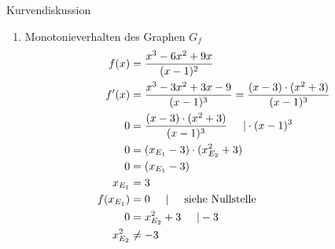 \begin{bsp}{Kurvendiskussion}{}
\begin{enumerate}
\begin{equation*}
\end{equation*}
Damit ergibt sich eine einfache Nullstelle bei $x_1= 0$ und eine doppelte Nullstelle bei $x_{2/3} = 3$
\begin{equation*}
    \begin{split}
        f(0) &= \dfrac{0^3-6\cdot0^2+9\cdot 0}{(0-1)^2}\\
         &= \dfrac{0}{1} = 0
    \end{split}
\end{equation*}
Der Schnittpunkt mit der y-Achse ergibt sich damit bei $SP_{\text{y}}(0|0)$.
 \item Monotonieverhalten des Graphen $G_f$
 \begin{equation*}
    \begin{split}
        f(x) &= \dfrac{x^3-6x^2+9x}{(x-1)^2}\\
         f'(x) &= \dfrac{x^3-3x^2+3x-9}{(x-1)^3} = \dfrac{(x-3)\cdot (x^2+3)}{(x-1)^3}\\
         0 &= \dfrac{(x-3)\cdot (x^2+3)}{(x-1)^3} \hspace{0.5cm} | \cdot (x-1)^3\\
         0&=( x_{E_1}-3)\cdot (x_{E_2}^2+3)\\
         0 &= ( x_{E_1}-3)\\
         x_{E_1} &= 3\\
         f(x_{E_1}) &= 0 \hspace{0.5cm} | \hspace{0.5cm}\text{siehe Nullstelle}\\
         0&= x_{E_2}^2+3 \hspace{0.5cm} | -3 \\
         x_{E_2}^2&\neq -3
    \end{split}
\end{equation*}


\end{enumerate}
\end{bsp}
